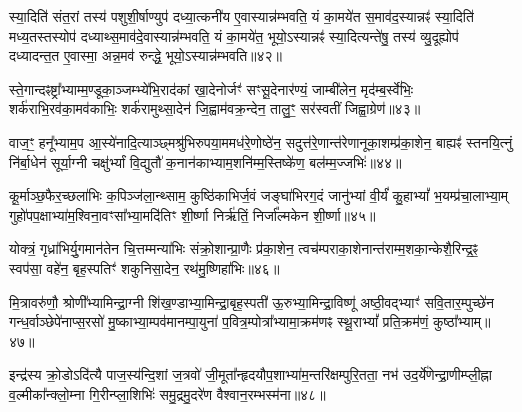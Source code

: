 स्या॒दिति॑ संत॒रां तस्य॑ पशुशी॒र्\mbox{}षाण्युप॑ दध्या॒त्कनी॑य ए॒वास्यान्न॑म्भवति॒ यं का॒मये॑त स॒माव॑द॒स्यान्नꣴ॑ स्या॒दिति॑ मध्य॒तस्तस्योप॑ दध्याथ्स॒माव॑दे॒वास्यान्न॑म्भवति॒ यं का॒मये॑त॒ भूयो॒\-ऽस्यान्नꣴ॑ स्या॒दित्यन्ते॑षु॒ तस्य॑ व्यु॒दूह्योप॑ दध्यादन्त॒त ए॒वास्मा॒ अन्न॒मव॑ रुन्द्धे॒ भूयो॒\-ऽस्यान्न॑म्भवति॥४२॥

{\anuvakamend[{ए॒न॒म॒स्यान्न॒म्भूयो॒स्यान्न॑म्भवति॥10॥}]}

स्ते॒गान्दꣴष्ट्रा᳚भ्याम्म॒ण्डूका॒ञ्जम्भ्ये॑भि॒राद॑कां खा॒देनोर्जꣳ॑ सꣳसू॒देनार॑ण्यं॒ जाम्बी॑लेन॒ मृद॑म्ब॒र्स्वे॑भिः॒ शर्क॑राभि॒रव॑का॒मव॑काभिः॒ शर्क॑रामुथ्सा॒देन॑ जि॒ह्वाम॑वक्र॒न्देन॒ तालु॒ꣳ॒ सर॑स्वतीं जिह्वा॒ग्रेण॑॥४३॥

{\anuvakamend[{स्ते॒गान्द्वाविꣳ॑शतिः॥11॥}]}

वाज॒ꣳ॒ हनू᳚भ्याम॒प आ॒स्ये॑नादि॒त्याञ्छ्मश्रु॑भिरुपया॒ममध॑रे॒णोष्ठे॑न॒ सदुत्त॑रे॒णान्त॑रेणानूका॒शम्प्र॑का॒शेन॒ बाह्यꣴ॑ स्तनयि॒त्नुं नि॑र्बा॒धेन॑ सूर्या॒ग्नी चक्षु॑र्भ्यां वि॒द्युतौ॑ क॒नान॑काभ्याम॒शनि॑म्म॒स्तिष्के॑ण॒ बल॑म्म॒ज्जभिः॑॥४४॥

{\anuvakamend[{वाजं॒ पञ्च॑विꣳशतिः॥12॥}]}

कू॒र्माञ्छ॒फैर॒च्छला॑भिः क॒पिञ्ज॑ला॒न्थ्साम॒ कुष्ठि॑काभिर्ज॒वं जङ्घा॑भिरग॒दं जानु॑भ्यां वी॒र्यं॑ कु॒हा\-भ्यां᳚ भ॒यम्प्र॑चा॒लाभ्या॒म् गुहो॑पप॒क्षाभ्या॑म॒श्विना॒वꣳसा᳚भ्या॒मदि॑तिꣳ शी॒र्ष्णा निर्\mbox{}ऋ॑तिं॒ निर्जा᳚ल्मकेन शी॒र्ष्णा॥४५॥

{\anuvakamend[{कू॒र्मान्त्रयो॑विꣳशतिः॥13॥}]}

योक्त्रं॒ गृध्रा॑भिर्यु॒गमान॑तेन चि॒त्तम्मन्या॑भिः संक्रो॒शान्प्रा॒णैः प्र॑का॒शेन॒ त्वच॑म्पराका॒शेनान्त॑राम्म॒शका॒न्केशै॒रिन्द्र॒ꣴ॒ स्वप॑सा॒ वहे॑न॒ बृह॒स्पतिꣳ॑ शकुनिसा॒देन॒ रथ॑मु॒ष्णिहा॑भिः॥४६॥

{\anuvakamend[{योक्त्र॒मेक॑विꣳशतिः॥14॥}]}

मि॒त्रावरु॑णौ॒ श्रोणी᳚भ्यामिन्द्रा॒ग्नी शि॑ख॒ण्डाभ्या॒मिन्द्रा॒बृह॒स्पती॑ ऊ॒रुभ्या॒मिन्द्रा॒विष्णू॑ अष्ठी॒वद्भ्याꣳ॑ सवि॒तार॒म्पुच्छे॑न गन्ध॒र्वाञ्छेपे॑नाप्स॒रसो॑ मु॒ष्काभ्या॒म्पव॑मानम्पा॒युना॑ प॒वित्र॒म्पोत्रा᳚भ्यामा॒क्रम॑णꣴ स्थू॒रा\-भ्यां᳚ प्रति॒क्रम॑णं॒ कुष्ठा᳚भ्याम्॥४७॥

{\anuvakamend[{॥15॥}]}

इन्द्र॑स्य क्रो॒डो\-ऽदि॑त्यै पाज॒स्य॑न्दि॒शां ज॒त्रवो॑ जी॒मूता᳚न्हृदयौप॒शाभ्या॑म॒न्तरि॑क्षम्पुरि॒तता॒ नभ॑ उद॒र्ये॑णेन्द्रा॒णीम्प्ली॒ह्ना व॒ल्मीका᳚न्क्लो॒म्ना गि॒रीन्प्ला॒शिभिः॑ समु॒द्रमु॒दरे॑ण वैश्वान॒रम्भस्म॑ना॥४८॥

{\anuvakamend[{मि॒त्रावरु॑णा॒विन्द्र॑स्य॒ द्वाविꣳ॑शति॒र्द्वाविꣳ॑शतिः॥16॥}]}

